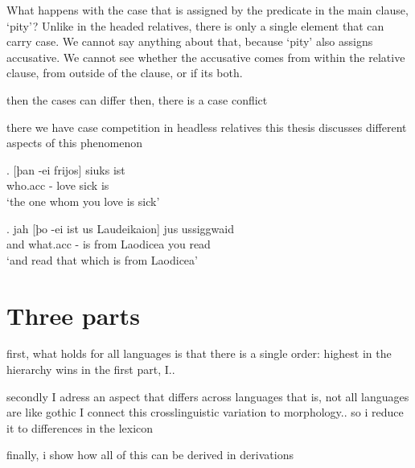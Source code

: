What happens with the case that is assigned by the predicate in the main clause,  `pity'? Unlike in the headed relatives, there is only a single element that can carry case. We cannot say anything about that, because  `pity' also assigns accusative. We cannot see whether the accusative comes from within the relative clause, from outside of the clause, or if its both.

then the cases can differ
then, there is a case conflict

there we have case competition in headless relatives
this thesis discusses different aspects of this phenomenon

\exg. [þan -ei frijos] siuks ist\\
 who.\ac{acc} - love\scsub{[acc]} sick is\scsub{[nom]}\\
 `the one whom you love is sick' 

\exg. jah [þo -ei ist us Laudeikaion] jus ussiggwaid\\
 and what.\ac{acc} - is\scsub{[nom]} from Laodicea you read\scsub{[acc]}\\
 `and read that which is from Laodicea' 


\section{Three parts}

first, what holds for all languages is that there is a single order: highest in the hierarchy wins
in the first part, I..

secondly I adress an aspect that differs across languages
that is, not all languages are like gothic
I connect this crosslinguistic variation to morphology.. so i reduce it to differences in the lexicon

finally, i show how all of this can be derived in derivations
